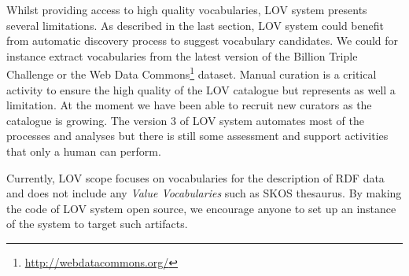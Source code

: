 \documentclass{iosart2c}
\begin{document}



Whilst providing access to high quality vocabularies, LOV system presents several limitations. As described in the last section, LOV system could benefit from automatic discovery process to suggest vocabulary candidates. We could for instance extract vocabularies from the latest version of the Billion Triple Challenge or the Web Data Commons\footnote{\url{http://webdatacommons.org/}} dataset. Manual curation is a critical activity to ensure the high quality of the LOV catalogue but represents as well a limitation. At the moment we have been able to recruit new curators as the catalogue is growing. The version 3 of LOV system automates most of the processes and analyses but there is still some assessment and support activities that only a human can perform.

Currently, LOV scope focuses on vocabularies for the description of RDF data and does not include any \emph{Value Vocabularies} such as SKOS thesaurus. By making the code of LOV system open source, we encourage anyone to set up an instance of the system to target such artifacts. 
\end{document}
